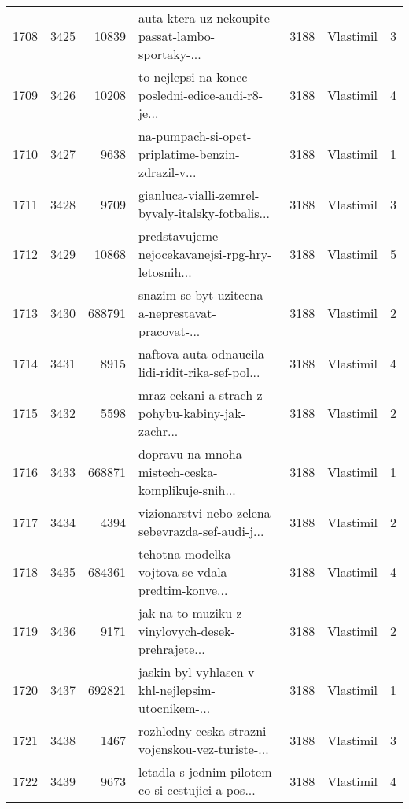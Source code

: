 \begin{tabular}{lrrlrlr}
1708 &       3425 &    10839 &  auta-ktera-uz-nekoupite-passat-lambo-sportaky-... &     3188 &                    Vlastimil &               3 \\
1709 &       3426 &    10208 &  to-nejlepsi-na-konec-posledni-edice-audi-r8-je... &     3188 &                    Vlastimil &               4 \\
1710 &       3427 &     9638 &  na-pumpach-si-opet-priplatime-benzin-zdrazil-v... &     3188 &                    Vlastimil &               1 \\
1711 &       3428 &     9709 &  gianluca-vialli-zemrel-byvaly-italsky-fotbalis... &     3188 &                    Vlastimil &               3 \\
1712 &       3429 &    10868 &  predstavujeme-nejocekavanejsi-rpg-hry-letosnih... &     3188 &                    Vlastimil &               5 \\
1713 &       3430 &   688791 &  snazim-se-byt-uzitecna-a-neprestavat-pracovat-... &     3188 &                    Vlastimil &               2 \\
1714 &       3431 &     8915 &  naftova-auta-odnaucila-lidi-ridit-rika-sef-pol... &     3188 &                    Vlastimil &               4 \\
1715 &       3432 &     5598 &  mraz-cekani-a-strach-z-pohybu-kabiny-jak-zachr... &     3188 &                    Vlastimil &               2 \\
1716 &       3433 &   668871 &  dopravu-na-mnoha-mistech-ceska-komplikuje-snih... &     3188 &                    Vlastimil &               1 \\
1717 &       3434 &     4394 &  vizionarstvi-nebo-zelena-sebevrazda-sef-audi-j... &     3188 &                    Vlastimil &               2 \\
1718 &       3435 &   684361 &  tehotna-modelka-vojtova-se-vdala-predtim-konve... &     3188 &                    Vlastimil &               4 \\
1719 &       3436 &     9171 &  jak-na-to-muziku-z-vinylovych-desek-prehrajete... &     3188 &                    Vlastimil &               2 \\
1720 &       3437 &   692821 &  jaskin-byl-vyhlasen-v-khl-nejlepsim-utocnikem-... &     3188 &                    Vlastimil &               1 \\
1721 &       3438 &     1467 &  rozhledny-ceska-strazni-vojenskou-vez-turiste-... &     3188 &                    Vlastimil &               3 \\
1722 &       3439 &     9673 &  letadla-s-jednim-pilotem-co-si-cestujici-a-pos... &     3188 &                    Vlastimil &               4 \\

\end{tabular}

